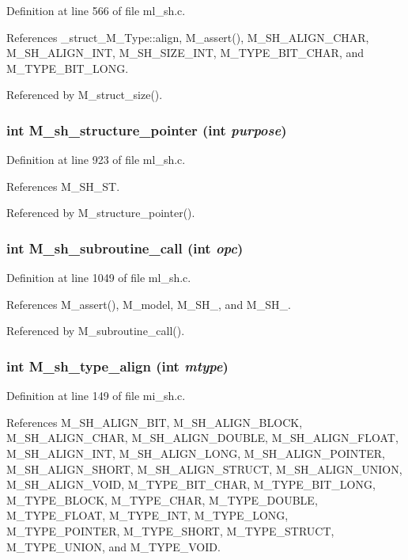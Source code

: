 Definition at line 566 of file ml\_\-sh.c.

References \_\-struct\_\-M\_\-Type::align, M\_\-assert(), M\_\-SH\_\-ALIGN\_\-CHAR, M\_\-SH\_\-ALIGN\_\-INT, M\_\-SH\_\-SIZE\_\-INT, M\_\-TYPE\_\-BIT\_\-CHAR, and M\_\-TYPE\_\-BIT\_\-LONG.

Referenced by M\_\-struct\_\-size().
\subsubsection{\setlength{\rightskip}{0pt plus 5cm}int M\_\-sh\_\-structure\_\-pointer (int {\em purpose})}\label{m__sh_8h_6209ea8c8d083f24d1c154f9939a402d}




Definition at line 923 of file ml\_\-sh.c.

References M\_\-SH\_\-ST.

Referenced by M\_\-structure\_\-pointer().
\subsubsection{\setlength{\rightskip}{0pt plus 5cm}int M\_\-sh\_\-subroutine\_\-call (int {\em opc})}\label{m__sh_8h_895bc24c27d58fe71769a3dbef15abb6}




Definition at line 1049 of file ml\_\-sh.c.

References M\_\-assert(), M\_\-model, M\_\-SH\_, and M\_\-SH\_.

Referenced by M\_\-subroutine\_\-call().
\subsubsection{\setlength{\rightskip}{0pt plus 5cm}int M\_\-sh\_\-type\_\-align (int {\em mtype})}\label{m__sh_8h_10e7d0c8a90ef77b55640a652fe59586}




Definition at line 149 of file mi\_\-sh.c.

References M\_\-SH\_\-ALIGN\_\-BIT, M\_\-SH\_\-ALIGN\_\-BLOCK, M\_\-SH\_\-ALIGN\_\-CHAR, M\_\-SH\_\-ALIGN\_\-DOUBLE, M\_\-SH\_\-ALIGN\_\-FLOAT, M\_\-SH\_\-ALIGN\_\-INT, M\_\-SH\_\-ALIGN\_\-LONG, M\_\-SH\_\-ALIGN\_\-POINTER, M\_\-SH\_\-ALIGN\_\-SHORT, M\_\-SH\_\-ALIGN\_\-STRUCT, M\_\-SH\_\-ALIGN\_\-UNION, M\_\-SH\_\-ALIGN\_\-VOID, M\_\-TYPE\_\-BIT\_\-CHAR, M\_\-TYPE\_\-BIT\_\-LONG, M\_\-TYPE\_\-BLOCK, M\_\-TYPE\_\-CHAR, M\_\-TYPE\_\-DOUBLE, M\_\-TYPE\_\-FLOAT, M\_\-TYPE\_\-INT, M\_\-TYPE\_\-LONG, M\_\-TYPE\_\-POINTER, M\_\-TYPE\_\-SHORT, M\_\-TYPE\_\-STRUCT, M\_\-TYPE\_\-UNION, and M\_\-TYPE\_\-VOID.

